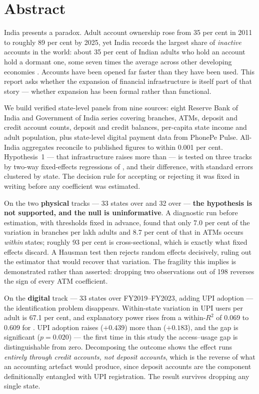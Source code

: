 \chapter*{Abstract}

India presents a paradox. Adult account ownership rose from 35 per cent in 2011 to roughly 89 per
cent by 2025, yet India records the largest share of \emph{inactive} accounts in the world: about
35 per cent of Indian adults who hold an account hold a dormant one, some seven times the average
across other developing economies \citep{findex2021,findex2025}. Accounts have been opened far
faster than they have been used. This report asks whether the expansion of financial infrastructure
is itself part of that story --- whether expansion has been formal rather than functional.

We build verified state-level panels from nine sources: eight Reserve Bank of India and Government
of India series covering branches, ATMs, deposit and credit account counts, deposit and credit
balances, per-capita state income and adult population, plus state-level digital payment data from
PhonePe Pulse. All-India aggregates reconcile to published figures to within 0.001 per cent.
Hypothesis~1 --- that infrastructure raises \Access{} more than \Usage{} --- is tested on three
tracks by two-way fixed-effects regressions of \Access{}, \Usage{} and their difference, with
standard errors clustered by state. The decision rule for accepting or rejecting it was fixed in
writing before any coefficient was estimated.

On the two \textbf{physical} tracks --- 33 states over \panelA{} and 32 over \panelB{} ---
\textbf{the hypothesis is not supported, and the null is uninformative}. A diagnostic run before
estimation, with thresholds fixed in advance, found that only 7.0 per cent of the variation in
branches per lakh adults and 8.7 per cent of that in ATMs occurs \emph{within} states; roughly 93
per cent is cross-sectional, which is exactly what fixed effects discard. A Hausman test then
rejects random effects decisively, ruling out the estimator that would recover that variation. The
fragility this implies is demonstrated rather than asserted: dropping two observations out of 198
reverses the sign of every ATM coefficient.

On the \textbf{digital} track --- 33 states over FY2019--FY2023, adding UPI adoption --- the
identification problem disappears. Within-state variation in UPI users per adult is 67.1 per cent,
and explanatory power rises from a within-$R^2$ of 0.069 to 0.609 for \Access{}. UPI adoption
raises \Access{} ($+0.439$) more than \Usage{} ($+0.183$), and the gap is significant
($p = 0.020$) --- the first time in this study the access--usage gap is distinguishable from zero.
Decomposing the outcome shows the effect runs \emph{entirely through credit accounts, not deposit
accounts}, which is the reverse of what an accounting artefact would produce, since deposit
accounts are the component definitionally entangled with UPI registration. The result survives
dropping any single state.

